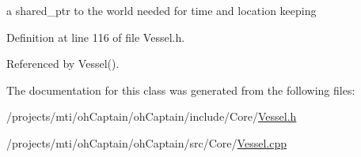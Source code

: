 a shared\+\_\+ptr to the world needed for time and location keeping 



Definition at line 116 of file Vessel.\+h.



Referenced by Vessel().



The documentation for this class was generated from the following files\+:\begin{DoxyCompactItemize}
\item 
/projects/mti/oh\+Captain/oh\+Captain/include/\+Core/\hyperlink{_vessel_8h}{Vessel.\+h}\item 
/projects/mti/oh\+Captain/oh\+Captain/src/\+Core/\hyperlink{_vessel_8cpp}{Vessel.\+cpp}\end{DoxyCompactItemize}
